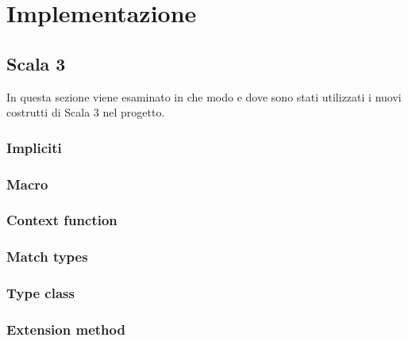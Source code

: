 \chapter{Implementazione}\label{ch:implementazione}
\section{Scala 3}\label{sec:scala-3}
In questa sezione viene esaminato in che modo e dove sono stati utilizzati i nuovi costrutti di Scala 3 nel progetto.

\subsection{Impliciti}\label{subsec:impliciti}

\subsection{Macro}\label{subsec:macro}

\subsection{Context function}\label{subsec:context-function}

\subsection{Match types}\label{subsec:match-types}

\subsection{Type class}\label{subsec:type-class}

\subsection{Extension method}\label{subsec:extension-method}

